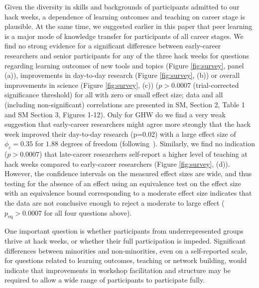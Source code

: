 Given the diversity in skills and backgrounds of participants admitted to our hack weeks, a dependence of learning outcomes and teaching on career stage is plausible. At the same time, we suggested earlier in this paper that peer learning is a major mode of knowledge transfer for participants of all career stages. We find no strong evidence for a significant difference between early-career researchers and senior participants for any of the three hack weeks for questions regarding learning outcomes of new tools and topics (Figure \ref{fig:survey}, panel (a)), improvements in day-to-day research (Figure \ref{fig:survey}, (b)) or overall improvements in science (Figure \ref{fig:survey}, (c)) ($p > 0.0007$ (trial-corrected significance threshold) for all with zero or small effect size; data and all (including non-significant) correlations are presented in SM, Section 2, Table 1 and SM Section 3, Figures 1-12). Only for GHW do we find a very weak suggestion that early-career researchers might agree more strongly that the hack week improved their day-to-day research (p=0.02) with a large effect size of $\phi_c = 0.35$ for $1.88$ degrees of freedom (following~\citep{cohen1988}).
Similarly, we find no indication ($p > 0.0007$) that late-career researchers self-report a higher level of teaching at hack weeks compared to early-career researchers (Figure \ref{fig:survey}, (d)). However, the confidence intervals on the measured effect sizes are wide, and thus testing for the absence of an effect using an equivalence test on the effect size with an equivalence bound corresponding to a moderate effect size indicates that the data are not conclusive enough to reject a moderate to large effect ($ p_\mathrm{eq} > 0.0007$ for all four questions above). 

One important question is whether participants from underrepresented groups thrive at hack weeks, or whether their full participation is impeded. Significant differences between minorities and non-minorities, even on a self-reported scale, for questions related to learning outcomes, teaching or network building, would indicate that improvements in workshop facilitation and structure may be required to allow a wide range of participants to participate fully.

